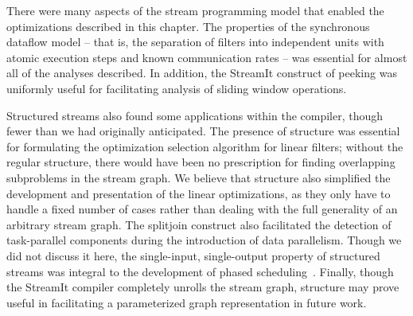 There were many aspects of the stream programming model that enabled
the optimizations described in this chapter.  The properties of the
synchronous dataflow model -- that is, the separation of filters into
independent units with atomic execution steps and known communication
rates -- was essential for almost all of the analyses described.  In
addition, the StreamIt construct of peeking was uniformly useful for
facilitating analysis of sliding window operations.

Structured streams also found some applications within the compiler,
though fewer than we had originally anticipated.  The presence of
structure was essential for formulating the optimization selection
algorithm for linear filters; without the regular structure, there
would have been no prescription for finding overlapping subproblems in
the stream graph.  We believe that structure also simplified the
development and presentation of the linear optimizations, as they only
have to handle a fixed number of cases rather than dealing with the
full generality of an arbitrary stream graph.  The splitjoin construct
also facilitated the detection of task-parallel components during the
introduction of data parallelism.  Though we did not discuss it here,
the single-input, single-output property of structured streams was
integral to the development of phased
scheduling~\cite{karczmarek-lctes03,karczma-thesis}.  Finally,
though the StreamIt compiler completely unrolls the stream graph,
structure may prove useful in facilitating a parameterized graph
representation in future work.




